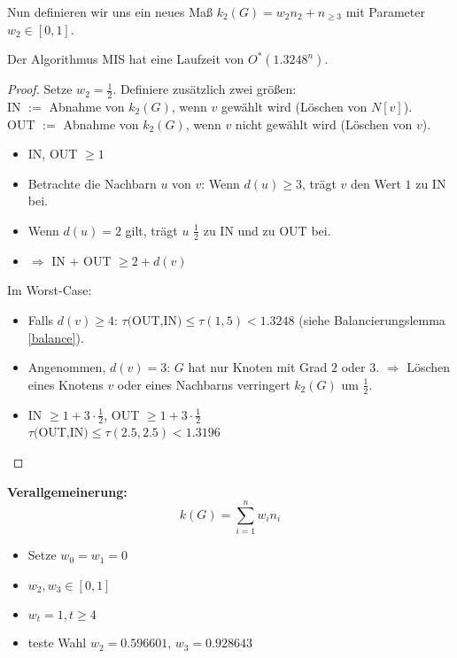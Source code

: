   Nun definieren wir uns ein neues Maß $k_2(G) = w_2 n_2 + n_{\geq 3}$ mit Parameter $w_2 \in [0,1]$.
  
  \begin{lemma}
   Der Algorithmus MIS hat eine Laufzeit von $O^*(1.3248^n)$.
  \end{lemma}
  \begin{proof}
   Setze $w_2 = \frac{1}{2}$. Definiere zusätzlich zwei größen:\\
   IN $:=$ Abnahme von $k_2(G)$, wenn $v$ gewählt wird (Löschen von $N[v]$).\\
   OUT $:=$ Abnahme von $k_2(G)$, wenn $v$ nicht gewählt wird (Löschen von $v$).
   
   \begin{itemize}
    \item IN, OUT $\geq 1$
    \item Betrachte die Nachbarn $u$ von $v$: Wenn $d(u) \geq 3$, trägt $v$ den Wert $1$ zu IN bei.
    \item Wenn $d(u) = 2$ gilt, trägt $u$ $\frac{1}{2}$ zu IN und zu OUT bei.
    \item $\Rightarrow$ IN $+$ OUT $\geq 2 + d(v)$
   \end{itemize}
   
   Im Worst-Case:\\
   \begin{itemize}
    \item Falls $d(v) \geq 4$: $\tau($OUT,IN$) \leq \tau(1,5) < 1.3248$ (siehe Balancierungslemma \ref{balance}).
    \item Angenommen, $d(v) = 3$: $G$ hat nur Knoten mit Grad $2$ oder $3$. $\Rightarrow$ Löschen eines Knotens $v$ oder eines Nachbarns verringert $k_2(G)$ um $\frac{1}{2}$.
    \item IN $\geq 1+3\cdot \frac{1}{2}$, OUT $\geq 1+3\cdot \frac{1}{2}$\\
	  $\tau($OUT,IN$) \leq \tau(2.5,2.5) < 1.3196$
   \end{itemize}
  \end{proof}
  
  \textbf{Verallgemeinerung:} 
  \[k(G) = \sum_{i=1}^n w_i n_i\]
  
  \begin{itemize}
   \item Setze $w_0 = w_1 = 0$
   \item $w_2, w_3 \in [0,1]$
   \item $w_t = 1, t \geq 4$
   \item teste Wahl $w_2 = 0.596601$, $w_3 = 0.928643$
  \end{itemize}
  
